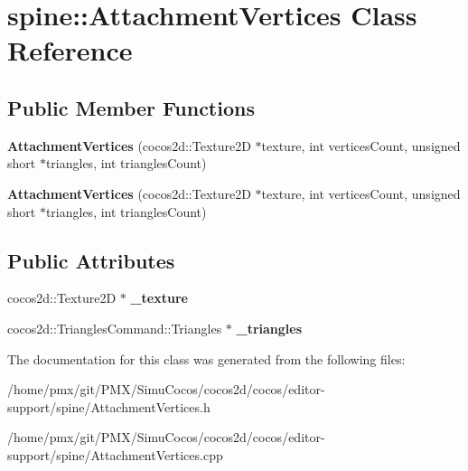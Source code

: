 \hypertarget{classspine_1_1AttachmentVertices}{}\section{spine\+:\+:Attachment\+Vertices Class Reference}
\label{classspine_1_1AttachmentVertices}
\subsection*{Public Member Functions}
\begin{DoxyCompactItemize}
\item 
\mbox{\label{classspine_1_1AttachmentVertices_acd9ee0ca4e6bafa178e8de8dcdadf39e}} 
{\bfseries Attachment\+Vertices} (cocos2d\+::\+Texture2D $\ast$texture, int vertices\+Count, unsigned short $\ast$triangles, int triangles\+Count)
\item 
\mbox{\label{classspine_1_1AttachmentVertices_acd9ee0ca4e6bafa178e8de8dcdadf39e}} 
{\bfseries Attachment\+Vertices} (cocos2d\+::\+Texture2D $\ast$texture, int vertices\+Count, unsigned short $\ast$triangles, int triangles\+Count)
\end{DoxyCompactItemize}
\subsection*{Public Attributes}
\begin{DoxyCompactItemize}
\item 
\mbox{\label{classspine_1_1AttachmentVertices_aca53af5bf4715bb518a8841365f96571}} 
cocos2d\+::\+Texture2D $\ast$ {\bfseries \+\_\+texture}
\item 
\mbox{\label{classspine_1_1AttachmentVertices_aa1f48227f043a04394330b0e6ffa6722}} 
cocos2d\+::\+Triangles\+Command\+::\+Triangles $\ast$ {\bfseries \+\_\+triangles}
\end{DoxyCompactItemize}


The documentation for this class was generated from the following files\+:\begin{DoxyCompactItemize}
\item 
/home/pmx/git/\+P\+M\+X/\+Simu\+Cocos/cocos2d/cocos/editor-\/support/spine/Attachment\+Vertices.\+h\item 
/home/pmx/git/\+P\+M\+X/\+Simu\+Cocos/cocos2d/cocos/editor-\/support/spine/Attachment\+Vertices.\+cpp\end{DoxyCompactItemize}
